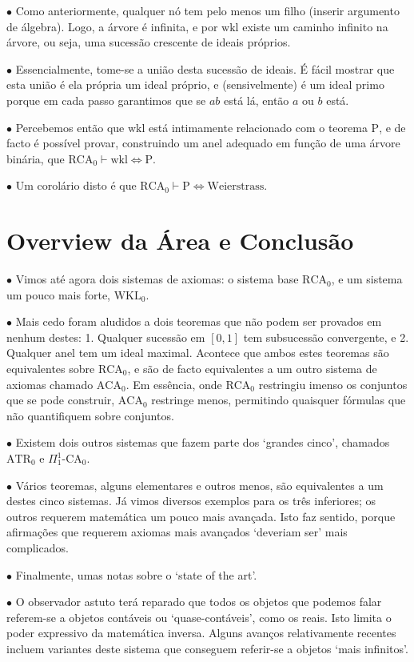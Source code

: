 \documentclass{article}
\theoremstyle{nonumberplain}
\newcommand{\RCA}{\mathrm{RCA}}
\newcommand{\WKL}{\mathrm{WKL}}
\newcommand{\ACA}{\mathrm{ACA}}
\newcommand{\wkl}{\mathrm{wkl}}
\newcommand\point[1]{\noindent \hspace{\labelsep} $\bullet$ #1 \smallskip}
\begin{document}
\point{Como anteriormente, qualquer nó tem pelo menos um filho (inserir argumento de álgebra). Logo, a árvore é infinita, e por $\wkl$ existe um caminho infinito na árvore, ou seja, uma sucessão crescente de ideais próprios.}

\point{Essencialmente, tome-se a união desta sucessão de ideais. É fácil mostrar que esta união é ela própria um ideal próprio, e (sensivelmente) é um ideal primo porque em cada passo garantimos que se $ab$ está lá, então $a$ ou $b$ está.}

\point{Percebemos então que $\wkl$ está intimamente relacionado com o teorema $\mathrm{P}$, e de facto é possível provar, construindo um anel adequado em função de uma árvore binária, que $\RCA_0 \vdash \wkl \iff \mathrm{P}$.}

\point{Um corolário disto é que $\RCA_0 \vdash \mathrm{P} \iff \text{Weierstrass}$.}

\section{Overview da Área e Conclusão}

\point{Vimos até agora dois sistemas de axiomas: o sistema base $\RCA_0$, e um sistema um pouco mais forte, $\WKL_0$.}

\point{Mais cedo foram aludidos a dois teoremas que não podem ser provados em nenhum destes: 1. Qualquer sucessão em $[0,1]$ tem subsucessão convergente, e 2. Qualquer anel tem um ideal maximal. Acontece que ambos estes teoremas são equivalentes sobre $\RCA_0$, e são de facto equivalentes a um outro sistema de axiomas chamado $\ACA_0$. Em essência, onde $\RCA_0$ restringiu imenso os conjuntos que se pode construir, $\ACA_0$ restringe menos, permitindo quaisquer fórmulas que não quantifiquem sobre conjuntos.}

\point{Existem dois outros sistemas que fazem parte dos `grandes cinco', chamados $\mathrm{ATR}_0$ e $\Pi^1_1\text{-}\mathrm{CA}_0$.}

\point{Vários teoremas, alguns elementares e outros menos, são equivalentes a um destes cinco sistemas. Já vimos diversos exemplos para os três inferiores; os outros requerem matemática um pouco mais avançada. Isto faz sentido, porque afirmações que requerem axiomas mais avançados `deveriam ser' mais complicados.}

\point{Finalmente, umas notas sobre o `state of the art'.}

\point{O observador astuto terá reparado que todos os objetos que podemos falar referem-se a objetos contáveis ou `quase-contáveis', como os reais. Isto limita o poder expressivo da matemática inversa. Alguns avanços relativamente recentes incluem variantes deste sistema que conseguem referir-se a objetos `mais infinitos'.}
\end{document}
